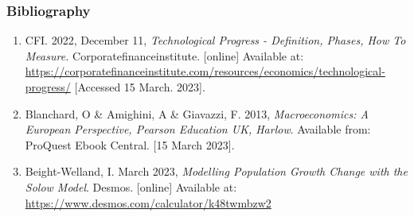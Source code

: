 \documentclass[
]{article}
\providecommand{\tightlist}{%
  \setlength{\itemsep}{0pt}\setlength{\parskip}{0pt}}
\begin{document}
\hypertarget{bibliography-1}{%
\subsubsection{Bibliography}\label{bibliography-1}}

\begin{enumerate}
\tightlist
\item
  CFI. 2022, December 11, \emph{Technological Progress - Definition,
  Phases, How To Measure.} Corporatefinanceinstitute. {[}online{]}
  Available at:
  \url{https://corporatefinanceinstitute.com/resources/economics/technological-progress/}
  {[}Accessed 15 March. 2023{]}.
\item
  Blanchard, O \& Amighini, A \& Giavazzi, F. 2013,
  \emph{Macroeconomics: A European Perspective, Pearson Education UK,
  Harlow}. Available from: ProQuest Ebook Central. {[}15 March 2023{]}.
\item
  Beight-Welland, I. March 2023, \emph{Modelling Population Growth
  Change with the Solow Model}. Desmos. {[}online{]} Available at:
  \url{https://www.desmos.com/calculator/k48twmbzw2}
\end{enumerate}
\end{document}
